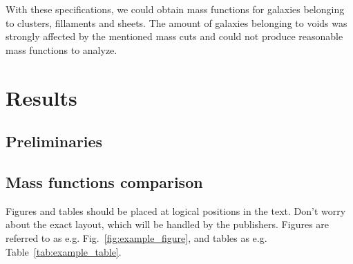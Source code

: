 \documentclass[a4paper,fleqn,usenatbib]{mnras}
\begin{document}
With these specifications, we could obtain mass functions for galaxies belonging to clusters, fillaments and sheets. The amount of galaxies belonging to voids was strongly affected by the mentioned mass cuts and could not produce reasonable mass functions to analyze.

\section{Results}
\subsection{Preliminaries}

\subsection{Mass functions comparison}

Figures and tables should be placed at logical positions in the text. Don't
worry about the exact layout, which will be handled by the publishers.
Figures are referred to as e.g. Fig.~\ref{fig:example_figure}, and tables as
e.g. Table~\ref{tab:example_table}.
\end{document}
